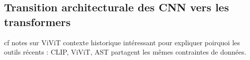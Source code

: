\subsection{Transition architecturale des CNN vers les transformers}

cf notes sur ViViT
contexte historique intéressant pour expliquer poirquoi les outils récents : CLIP, ViViT, AST partagent les mêmes contraintes de données.
